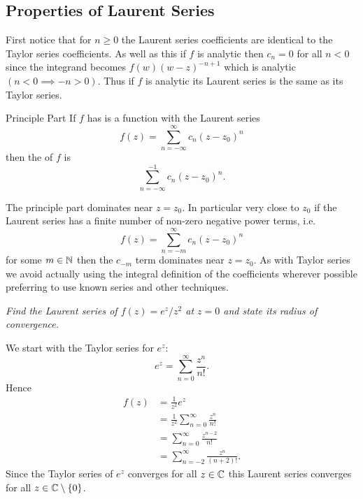 \documentclass{article}
\begin{document}
    \subsection{Properties of Laurent Series}
    First notice that for \(n \ge 0\) the Laurent series coefficients are identical to the Taylor series coefficients.
    As well as this if \(f\) is analytic then \(c_n = 0\) for all \(n < 0\) since the integrand becomes \(f(w) (w - z)^{-n+1}\) which is analytic \((n < 0 \implies -n > 0)\).
    Thus if \(f\) is analytic its Laurent series is the same as its Taylor series.
    \begin{definition}{Principle Part}{}
        If \(f\) has is a function with the Laurent series
        \[f(z) = \sum_{n=-\infty}^{\infty} c_n(z - z_0)^n\]
        then the  of \(f\) is
        \[\sum_{n=-\infty}^{-1}c_n(z - z_0)^n.\]
    \end{definition}
    The principle part dominates near \(z = z_0\).
    In particular very close to \(z_0\) if the Laurent series has a finite number of non-zero negative power terms, i.e.
    \[f(z) = \sum_{n=-m}^{\infty}c_n(z - z_0)^n\]
    for some \(m\in\mathbb{N}\) then the \(c_{-m}\) term dominates near \(z = z_0\).
    As with Taylor series we avoid actually using the integral definition of the coefficients wherever possible preferring to use known series and other techniques.
    \begin{example}
        \textit{Find the Laurent series of \(f(z) = e^z/z^2\) at \(z = 0\) and state its radius of convergence.}
        
        We start with the Taylor series for \(e^z\):
        \[e^z = \sum_{n=0}^{\infty} \frac{z^n}{n!}.\]
        Hence
        \begin{align*}
            f(z) &= \frac{1}{z^2}e^z\\
            &= \frac{1}{z^2} \sum_{n=0}^{\infty} \frac{z^n}{n!}\\
            &= \sum_{n=0}^{\infty} \frac{z^{n-2}}{n!}\\
            &= \sum_{n=-2}^{\infty} \frac{z^n}{(n+2)!}.
        \end{align*}
        Since the Taylor series of \(e^z\) converges for all \(z\in\mathbb{C}\) this Laurent series converges for all \(z\in\mathbb{C}\setminus\{0\}\).
    \end{example}
\end{document}
